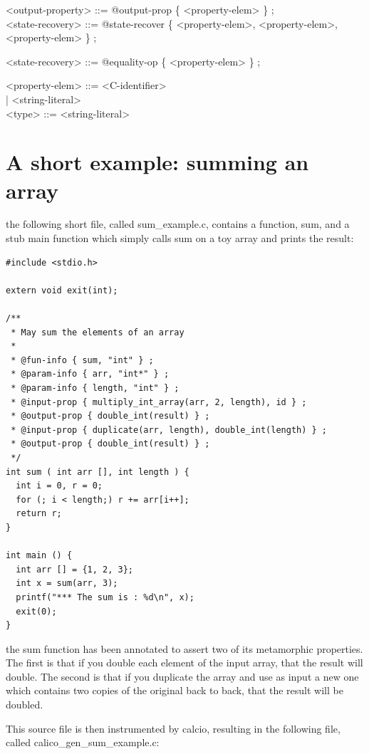 \documentclass[notitlepage]{article}
\begin{document}
<output-property> ::= @output-prop \{ <property-elem> \} ; \\

<state-recovery> ::= @state-recover \{ <property-elem>, <property-elem>, <property-elem> \} ;

<state-recovery> ::= @equality-op \{ <property-elem> \} ;

<property-elem> ::= <C-identifier> \\
\phantom{1}\hspace{85pt}| <string-literal> \\

<type> ::= <string-literal>


\rmfamily

\section{A short example: summing an array}

the following short file, called sum\_example.c, contains a function, sum, and a stub main function which simply calls sum on a toy array and prints the result:

\begin{verbatim}
#include <stdio.h>

extern void exit(int);

/**
 * May sum the elements of an array
 *
 * @fun-info { sum, "int" } ;
 * @param-info { arr, "int*" } ;
 * @param-info { length, "int" } ;
 * @input-prop { multiply_int_array(arr, 2, length), id } ;
 * @output-prop { double_int(result) } ;
 * @input-prop { duplicate(arr, length), double_int(length) } ;
 * @output-prop { double_int(result) } ;
 */
int sum ( int arr [], int length ) {
  int i = 0, r = 0;
  for (; i < length;) r += arr[i++];
  return r;
}

int main () {
  int arr [] = {1, 2, 3};
  int x = sum(arr, 3);
  printf("*** The sum is : %d\n", x);
  exit(0);
}
\end{verbatim}

the sum function has been annotated to assert two of its metamorphic properties. The first is that if you double each element of the input array, that the result will double. The second is that if you duplicate the array and use as input a new one which contains two copies of the original back to back, that the result will be doubled.

This source file is then instrumented by calcio, resulting in the following file, called calico\_gen\_sum\_example.c:
\end{document}

